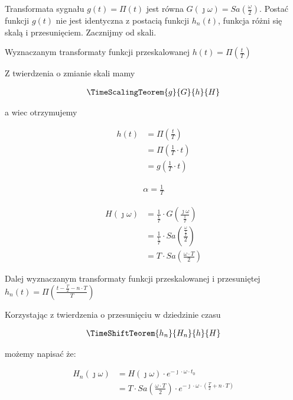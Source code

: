 \begin{task}
Transformata sygnału $g(t) = \Pi(t)$ jest równa $G(\jmath \omega)=Sa(\frac{\omega}{2})$. Postać funkcji $g(t)$ nie jest identyczna z postacią funkcji $h_n(t)$, funkcja różni się skalą i przesunięciem. Zacznijmy od skali. 

Wyznaczanym transformaty funkcji przeskalowanej $h(t)=\Pi\left(\frac{t}{T}\right)$

Z twierdzenia o zmianie skali mamy 

\begin{align*}
\TimeScalingTeorem{g}{G}{h}{H}
\end{align*}

a wiec otrzymujemy

\begin{align*}
h(t) &= \Pi\left(\frac{t}{T}\right)\\
&=\Pi\left(\frac{1}{T}\cdot t\right)\\
&=g\left(\frac{1}{T}\cdot t\right)
\end{align*}

\begin{align*}
\alpha=\frac{1}{T}
\end{align*}

\begin{align*}
H(\jmath \omega)&=\frac{1}{\frac{1}{T}} \cdot G\left(\frac{\jmath \omega}{\frac{1}{T}}\right)\\
&=\frac{1}{\frac{1}{T}} \cdot Sa\left(\frac{\frac{\omega}{\frac{1}{T}}}{2}\right)\\
&=T \cdot Sa\left(\frac{\omega \cdot T}{2}\right)
\end{align*}

Dalej wyznaczanym transformaty funkcji przeskalowanej i przesuniętej $h_n(t)=\Pi\left(\frac{t - \frac{T}{2} -n\cdot T }{T}\right)$

Korzystając z twierdzenia o przesunięciu w dziedzinie czasu 

\begin{align*}
\TimeShiftTeorem{h_n}{H_n}{h}{H}
\end{align*}

możemy napisać że:

\begin{align*}
H_n(\jmath\omega) &= H(\jmath\omega) \cdot e^{-\jmath \cdot \omega \cdot t_0}\\
&=T \cdot Sa\left(\frac{\omega \cdot T}{2}\right) \cdot e^{-\jmath \cdot \omega \cdot \left(\frac{T}{2} + n\cdot T\right)}
\end{align*}


\end{task}
